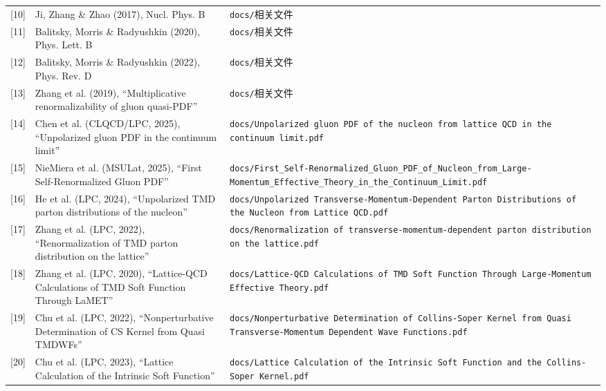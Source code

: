 \documentclass[12pt,a4paper]{ctexart}
\theoremstyle{definition}
\begin{document}
\begin{longtable}{lp{6cm}p{5cm}}
[10] & Ji, Zhang \& Zhao (2017), Nucl. Phys. B & \texttt{docs/}相关文件 \\

[11] & Balitsky, Morris \& Radyushkin (2020), Phys. Lett. B & \texttt{docs/}相关文件 \\

[12] & Balitsky, Morris \& Radyushkin (2022), Phys. Rev. D & \texttt{docs/}相关文件 \\

[13] & Zhang et al. (2019), ``Multiplicative renormalizability of gluon quasi-PDF'' & \texttt{docs/}相关文件 \\

[14] & Chen et al. (CLQCD/LPC, 2025), ``Unpolarized gluon PDF in the continuum limit'' & \texttt{docs/Unpolarized gluon PDF of the nucleon from lattice QCD in the continuum limit.pdf} \\

[15] & NieMiera et al. (MSULat, 2025), ``First Self-Renormalized Gluon PDF'' & \texttt{docs/First\_Self-Renormalized\_Gluon\_PDF\_of\_Nucleon\_from\_Large-Momentum\_Effective\_Theory\_in\_the\_Continuum\_Limit.pdf} \\

[16] & He et al. (LPC, 2024), ``Unpolarized TMD parton distributions of the nucleon'' & \texttt{docs/Unpolarized Transverse-Momentum-Dependent Parton Distributions of the Nucleon from Lattice QCD.pdf} \\

[17] & Zhang et al. (LPC, 2022), ``Renormalization of TMD parton distribution on the lattice'' & \texttt{docs/Renormalization of transverse-momentum-dependent parton distribution on the lattice.pdf} \\

[18] & Zhang et al. (LPC, 2020), ``Lattice-QCD Calculations of TMD Soft Function Through LaMET'' & \texttt{docs/Lattice-QCD Calculations of TMD Soft Function Through Large-Momentum Effective Theory.pdf} \\

[19] & Chu et al. (LPC, 2022), ``Nonperturbative Determination of CS Kernel from Quasi TMDWFs'' & \texttt{docs/Nonperturbative Determination of Collins-Soper Kernel from Quasi Transverse-Momentum Dependent Wave Functions.pdf} \\

[20] & Chu et al. (LPC, 2023), ``Lattice Calculation of the Intrinsic Soft Function'' & \texttt{docs/Lattice Calculation of the Intrinsic Soft Function and the Collins-Soper Kernel.pdf} \\


\end{longtable}
\end{document}
